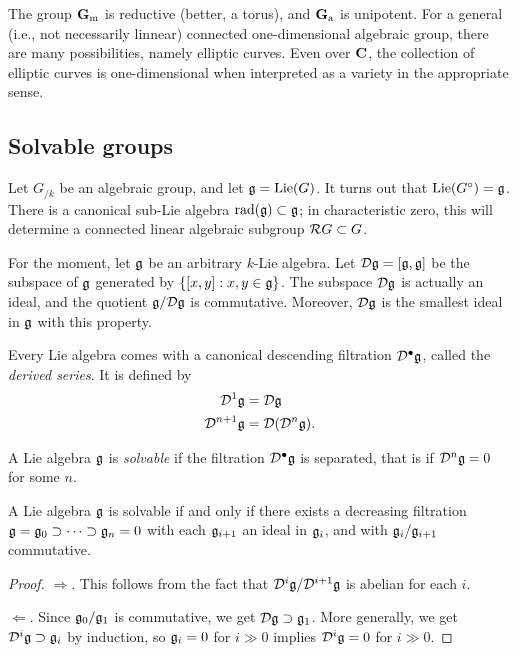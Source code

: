 The group $\mathbf{G}_\mathrm{m}$ is reductive (better, a torus), and $\mathbf{G}_\mathrm{a}$ is unipotent. For a 
general (i.e., not necessarily linnear) connected one-dimensional algebraic 
group, there are many possibilities, namely elliptic curves. Even over $\mathbf{C}$, 
the collection of elliptic curves is one-dimensional when interpreted as a 
variety in the appropriate sense. 





\subsection{Solvable groups}

Let $G_{/k}$ be an algebraic group, and let $\mathfrak{g}=\operatorname{Lie}(G)$. It turns out that 
$\operatorname{Lie}(G^\circ)=\mathfrak{g}$. There is a canonical sub-Lie algebra 
$\operatorname{rad}(\mathfrak{g})\subset \mathfrak{g}$; in characteristic zero, this will determine a 
connected linear algebraic subgroup $\mathcal{R} G\subset G$. 

For the moment, let $\mathfrak{g}$ be an arbitrary $k$-Lie algebra. 
Let $\mathcal{D}\mathfrak{g}=[\mathfrak{g},\mathfrak{g}]$ be the subspace 
of $\mathfrak{g}$ generated by $\{[x,y]:x,y\in \mathfrak{g}\}$.
The subspace $\mathcal{D}\mathfrak{g}$ is actually an ideal, and the quotient 
$\mathfrak{g}/\mathcal{D}\mathfrak{g}$ is commutative. Moreover, $\mathcal{D}\mathfrak{g}$ is the smallest 
ideal in $\mathfrak{g}$ with this property. 

Every Lie algebra comes with a canonical descending filtration 
$\mathcal{D}^\bullet\mathfrak{g}$, called the \emph{derived series}. It is defined by 
\begin{align*}
  \mathcal{D}^1\mathfrak{g} &= \mathcal{D} \mathfrak{g} \\
  \mathcal{D}^{n+1}\mathfrak{g} &=\mathcal{D}(\mathcal{D}^n\mathfrak{g}) .
\end{align*}

\begin{definition}
A Lie algebra $\mathfrak{g}$ is \emph{solvable} if the filtration $\mathcal{D}^\bullet\mathfrak{g}$ 
is separated, that is if $\mathcal{D}^n\mathfrak{g}=0$ for some $n$. 
\end{definition}

\begin{lemma}
A Lie algebra $\mathfrak{g}$ is solvable if and only if there exists a decreasing 
filtration $\mathfrak{g}=\mathfrak{g}_0\supset \cdots \supset \mathfrak{g}_n=0$ with each $\mathfrak{g}_{i+1}$ an 
ideal in $\mathfrak{g}_i$, and with $\mathfrak{g}_i/\mathfrak{g}_{i+1}$ commutative. 
\end{lemma}
\begin{proof}
$\Rightarrow$. This follows from the fact that 
$\mathcal{D}^i\mathfrak{g} / \mathcal{D}^{i+1}\mathfrak{g}$ is abelian for each $i$. 

$\Leftarrow$. Since $\mathfrak{g}_0/\mathfrak{g}_1$ is commutative, we get 
$\mathcal{D}\mathfrak{g}\supset\mathfrak{g}_1$. More generally, we get $\mathcal{D}^i\mathfrak{g}\supset \mathfrak{g}_i$ 
by induction, so $\mathfrak{g}_i=0$ for $i\gg 0$ implies $\mathcal{D}^i\mathfrak{g}=0$ for $i\gg 0$. 
\end{proof}

